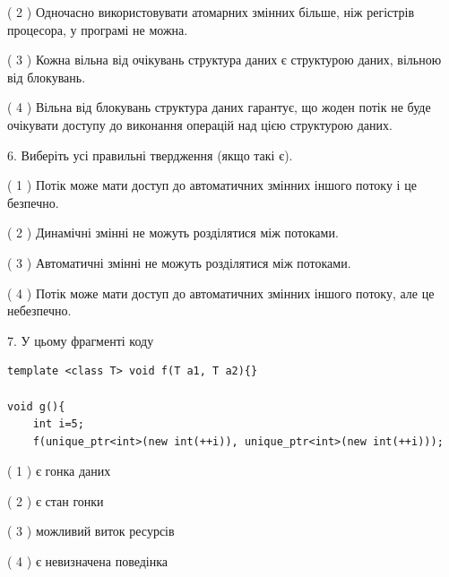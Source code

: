 \documentclass[12pt, ukrainian]{article}
\begin{document}
\begin {large}
{( 2 ) Одночасно використовувати атомарних змінних більше, ніж регістрів процесора, у програмі не можна.%

( 3 ) Кожна вільна від очікувань структура даних є структурою даних, вільною від блокувань.%

( 4 ) Вільна від блокувань структура даних гарантує, що жоден потік не буде очікувати доступу до виконання операцій над цією структурою даних.%
\newpage



\vspace{5mm}
6. Виберіть усі правильні твердження (якщо такі є).\par
\vspace{2mm}

( 1 ) Потік може мати доступ до автоматичних змінних іншого потоку і це безпечно.%

( 2 ) Динамічні змінні не можуть розділятися між потоками.%

( 3 ) Автоматичні змінні не можуть розділятися між потоками.%

( 4 ) Потік може мати доступ до автоматичних змінних іншого потоку, але це небезпечно.%


\vspace{5mm}
7. У цьому фрагменті коду
\begin{verbatim}
template <class T> void f(T a1, T a2){}

void g(){
    int i=5;
    f(unique_ptr<int>(new int(++i)), unique_ptr<int>(new int(++i)));
\end{verbatim}

( 1 ) є гонка даних%

( 2 ) є стан гонки%

( 3 ) можливий виток ресурсів%

( 4 ) є невизначена поведінка%
}
\end {large}
\end{document}
